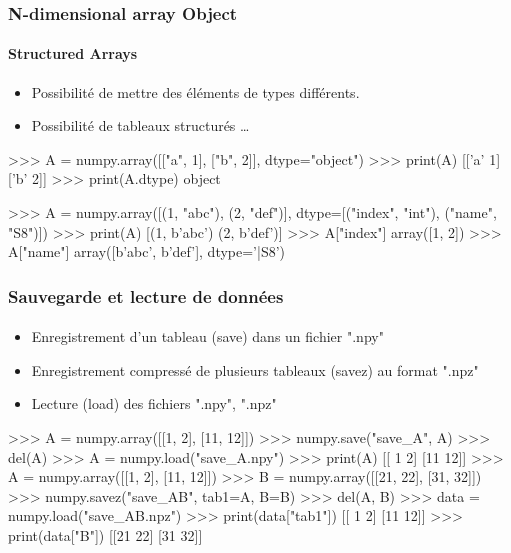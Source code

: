 \begin{frame}[fragile]
\frametitle{N-dimensional array Object}
\framesubtitle{Structured Arrays}
\begin{itemize}
 \item Possibilité de mettre des éléments de types différents.  
 \item Possibilité de tableaux structurés \dots
\end{itemize}
\begin{pythonConsole}
>>> A = numpy.array([["a", 1], ["b", 2]], dtype="object")
>>> print(A)
[['a' 1]
 ['b' 2]]
>>> print(A.dtype)
object

>>> A = numpy.array([(1, "abc"), (2, "def")], dtype=[("index", "int"), 
	("name", "S8")])                       
>>> print(A)              
[(1, b'abc') (2, b'def')]
>>> A["index"]
array([1, 2])    
>>> A["name"]                   
array([b'abc', b'def'], 
      dtype='|S8')
\end{pythonConsole}
\end{frame}
\begin{frame}[fragile]
\frametitle{Sauvegarde et lecture de données}
\framesubtitle{}
\begin{itemize}
 \item Enregistrement d'un tableau (save) dans un fichier ".npy"
 \item Enregistrement compressé de plusieurs tableaux (savez) au format ".npz"
 \item Lecture (load) des fichiers ".npy", ".npz"
\end{itemize}
\begin{pythonConsole}
>>> A = numpy.array([[1, 2], [11, 12]])
>>> numpy.save("save_A", A)
>>> del(A)
>>> A = numpy.load("save_A.npy")
>>> print(A)
[[ 1  2]
 [11 12]]
>>> A = numpy.array([[1, 2], [11, 12]])
>>> B = numpy.array([[21, 22], [31, 32]])
>>> numpy.savez("save_AB", tab1=A, B=B)
>>> del(A, B)
>>> data = numpy.load("save_AB.npz")
>>> print(data["tab1"])
[[ 1  2]
 [11 12]]
>>> print(data["B"])
[[21 22]
 [31 32]]
\end{pythonConsole}
\end{frame}
